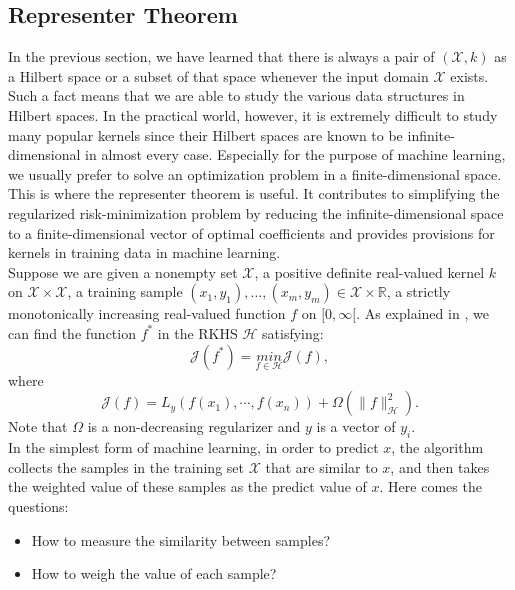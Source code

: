 \subsection{Representer Theorem}
In the previous section, we have learned that there is always a pair of $(\mathcal{X},k)$ as a Hilbert space or a subset of that space whenever the input domain $\mathcal{X}$ exists. Such a fact means that we are able to study the various data structures in Hilbert spaces. 
In the practical world, however, it is extremely difficult to study many popular kernels since their Hilbert spaces are known to be infinite-dimensional in almost every case. Especially for the purpose of machine learning, we usually prefer to solve an optimization problem in a finite-dimensional space. \\
This is where the representer theorem is useful. It contributes to simplifying the regularized risk-minimization problem by reducing the infinite-dimensional space to a finite-dimensional vector of optimal coefficients and provides provisions for kernels in training data in machine learning.\\
Suppose we are given a nonempty set $\mathcal{X}$, a positive definite real-valued kernel $k$ on $\mathcal{X}\times\mathcal{X}$, a training sample $(x_1,y_1),\dots,(x_m,y_m)\in\mathcal{X}\times\mathbb{R}$, a strictly monotonically increasing real-valued function $f$ on $[0,\infty[$. As explained in \citet{scholkopf2001generalized}, we can find the function $f^{*}$ in the RKHS $\mathcal{H}$ satisfying:
\begin{equation*}
    \mathcal{J}(f^{*})=\underset{f\in\mathcal{H}}{min}\mathcal{J}(f),
\end{equation*}
where 
\begin{equation*}
    \mathcal{J}(f)=L_y(f(x_1),\cdots,f(x_n))+\Omega(\parallel f \parallel_\mathcal{H}^2).
\end{equation*}
Note that $\Omega$ is a non-decreasing regularizer and $y$ is a vector of $y_i$. \\
In the simplest form of machine learning, in order to predict $x$, the algorithm collects the samples in the training set $\mathcal{X}$ that are similar to $x$, 
and then takes the weighted value of these samples as the predict value of $x$. Here comes the questions:
\begin{itemize}
    \item How to measure the similarity between samples?
    \item How to weigh the value of each sample?
\end{itemize} 
